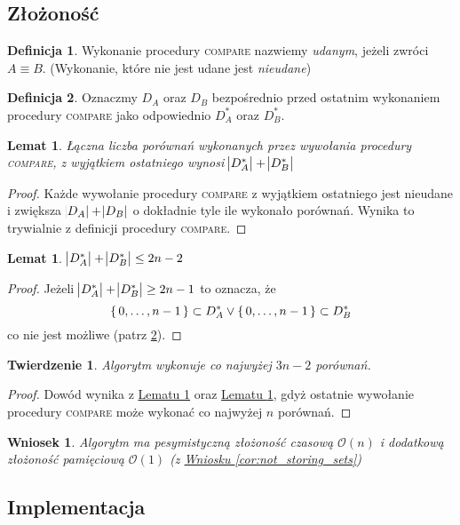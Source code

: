 \documentclass{scrartcl}
\theoremstyle{definition}
\theoremstyle{remark}
\theoremstyle{plain}
\theoremstyle{remark}
\theoremstyle{plain}
\theoremstyle{definition}
\newtheorem{def_success_compare}{Definicja}[section]
\newtheorem{def_D_star}[def_success_compare]{Definicja}
\theoremstyle{plain}
\newtheorem{lemma_unsuccesful_comparisons}
[lemma_equiv_if_lex_min_eq]{Lemat}
\newtheorem{lemma_d_star_len}[lemma_equiv_if_lex_min_eq]{Lemat}
\newtheorem{complexity_theorem}[termination_theorem]{Twierdzenie}
\newtheorem{o_complexity}[not_storing_sets]{Wniosek}
\begin{document}
\subsection{Złożoność}
\begin{def_success_compare}
	\label{def:success_compare}
	Wykonanie procedury \textnormal{\textsc{compare}}
	nazwiemy \emph{udanym}, jeżeli zwróci \(A\equiv B\).
	(Wykonanie, które nie jest udane jest \emph{nieudane})
\end{def_success_compare}
\begin{def_D_star}
	\label{def:D_star}
	Oznaczmy \(D_A\) oraz \(D_B\)
	bezpośrednio przed ostatnim wykonaniem
	procedury \textnormal{\textsc{compare}}
	jako odpowiednio \(D_A^*\) oraz \(D_B^*\).
\end{def_D_star}
\begin{lemma_unsuccesful_comparisons}
	\label{lem:unsuccesful_comparisons}
	Łączna liczba porównań wykonanych przez
	wywołania procedury \textnormal{\textsc{compare}},
	z wyjątkiem ostatniego wynosi
	\(\abs{D_A^*}+\abs{D_B^*}\)
\end{lemma_unsuccesful_comparisons}
\begin{proof}
	Każde wywołanie procedury \textsc{compare}
	z wyjątkiem ostatniego jest nieudane
	i zwiększa \(\abs{D_A}+\abs{D_B}\)
	o dokładnie tyle ile wykonało porównań.
	Wynika to trywialnie z definicji
	procedury \textsc{compare}.
\end{proof}
\begin{lemma_d_star_len}
	\label{lem:d_star_len}
	\(\abs{D_A^*}+\abs{D_B^*}\leq2n-2\)
\end{lemma_d_star_len}
\begin{proof}
	Jeżeli \(\abs{D_A^*}+\abs{D_B^*}\ge2n-1\)
	to oznacza, że
	\[\set{0,\dots,n-1}\subset D_A^* \lor
		\set{0,\dots,n-1}\subset D_B^*\]
	co nie jest możliwe (patrz \cref{def:D_star}).
\end{proof}
\begin{complexity_theorem}
	Algorytm wykonuje co najwyżej \(3n-2\) porównań.
\end{complexity_theorem}
\begin{proof}
	Dowód wynika z
	\hyperref[lem:unsuccesful_comparisons]
	{Lematu \ref*{lem:unsuccesful_comparisons}}
	oraz
	\hyperref[lem:d_star_len]{Lematu \ref*{lem:d_star_len}},
	gdyż ostatnie wywołanie procedury \textsc{compare}
	może wykonać co najwyżej \(n\) porównań.
\end{proof}
\begin{o_complexity}
	Algorytm ma pesymistyczną złożoność czasową \(\mathcal{O}(n)\)
	i dodatkową złożoność pamięciową \(\mathcal{O}(1)\)
	(z \hyperref[cor:not_storing_sets]
	{Wniosku \ref*{cor:not_storing_sets}})
\end{o_complexity}
\pagebreak
\subsection{Implementacja}
\inputminted{python3}{../implementacje/fast.py}
\pagebreak
\printbibliography[heading=bibintoc]
\end{document}
